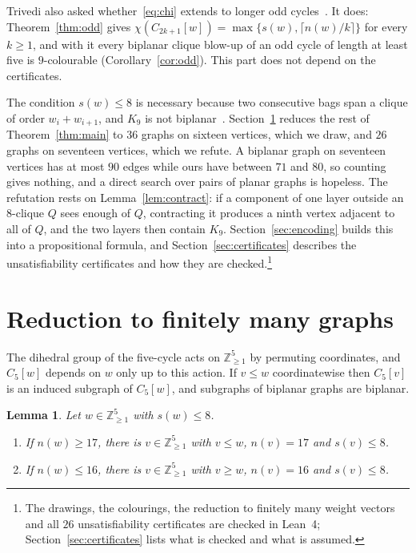 \documentclass[11pt]{amsart}
\newtheorem{lemma}[theorem]{Lemma}
\theoremstyle{definition}
\theoremstyle{remark}
\numberwithin{equation}{section}
\newcommand{\Z}{\mathbb{Z}}
\newcommand{\cw}{C_5[w]}
\begin{document}
Trivedi also asked whether~\eqref{eq:chi} extends to longer odd cycles~\cite[Question~7.1]{Tr}. It does: Theorem~\ref{thm:odd} gives $\chi(C_{2k+1}[w])=\max\{s(w),\lceil n(w)/k\rceil\}$ for every $k\ge1$, and with it every biplanar clique blow-up of an odd cycle of length at least five is $9$-colourable (Corollary~\ref{cor:odd}). This part does not depend on the certificates.

The condition $s(w)\le8$ is necessary because two consecutive bags span a clique of order $w_i+w_{i+1}$, and $K_9$ is not biplanar~\cite{BHK,Tu}. Section~\ref{sec:reduction} reduces the rest of Theorem~\ref{thm:main} to $36$ graphs on sixteen vertices, which we draw, and $26$ graphs on seventeen vertices, which we refute. A biplanar graph on seventeen vertices has at most $90$ edges while ours have between $71$ and $80$, so counting gives nothing, and a direct search over pairs of planar graphs is hopeless. The refutation rests on Lemma~\ref{lem:contract}: if a component of one layer outside an $8$-clique $Q$ sees enough of $Q$, contracting it produces a ninth vertex adjacent to all of $Q$, and the two layers then contain $K_9$. Section~\ref{sec:encoding} builds this into a propositional formula, and Section~\ref{sec:certificates} describes the unsatisfiability certificates and how they are checked.\footnote{The drawings, the colourings, the reduction to finitely many weight vectors and all $26$ unsatisfiability certificates are checked in Lean~4; Section~\ref{sec:certificates} lists what is checked and what is assumed.}

\section{Reduction to finitely many graphs}\label{sec:reduction}

The dihedral group of the five-cycle acts on $\Z_{\ge1}^5$ by permuting coordinates, and $\cw$ depends on $w$ only up to this action. If $v\le w$ coordinatewise then $C_5[v]$ is an induced subgraph of $\cw$, and subgraphs of biplanar graphs are biplanar.

\begin{lemma}\label{lem:reduce}
Let $w\in\Z_{\ge1}^5$ with $s(w)\le8$.
\begin{enumerate}[label=\textup{(\alph*)}]
\item If $n(w)\ge17$, there is $v\in\Z_{\ge1}^5$ with $v\le w$, $n(v)=17$ and $s(v)\le8$.
\item If $n(w)\le16$, there is $v\in\Z_{\ge1}^5$ with $v\ge w$, $n(v)=16$ and $s(v)\le8$.
\end{enumerate}
\end{lemma}
\end{document}

